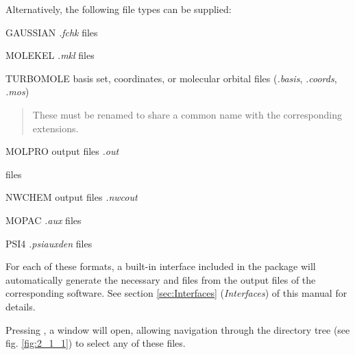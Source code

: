 \documentclass[10pt]{article}
\begin{document}
Alternatively, the following file types can be supplied:
\begin{itemize}
\item GAUSSIAN\footnotemark{} {\it .fchk} files
\item MOLEKEL {\it .mkl} files
\item TURBOMOLE basis set, coordinates, or molecular orbital files ({\it .basis}, {\it .coords}, {\it .mos})
\begin{quote}
\item These must be renamed to share a common name with the corresponding extensions.
\end{quote}
\item MOLPRO output files {\it .out}
\item \xml{ } files
\item NWCHEM output files {\it .nwcout}
\item MOPAC {\it .aux} files
\item PSI4 {\it .psiauxden} files
\end{itemize}

For each of these formats, a built-in interface included in the package
will automatically generate the necessary \ggbs{ } and \den{ } files from the output files
of the corresponding software. See section \ref{sec:Interfaces} ({\it Interfaces}) of this manual for details.

Pressing \teclapuntos, a window will open, allowing navigation through the directory tree
(see fig. \ref{fig:2_1_1}) to select any of these files.


\vspace*{5mm}
\end{document}
